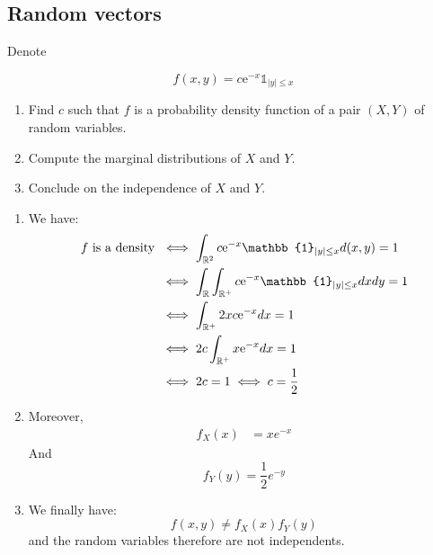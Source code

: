 \begin{center}
  \section*{Random vectors}
\end{center}


\begin{Exercise}
  Denote

  \[
    f(x, y)=c \mathrm{e}^{-x} \mathbb{1}_{|y| \leq x}
  \]

  \begin{enumerate}
    \item Find $c$ such that $f$ is a probability density function of a pair $(X, Y)$ of
          random variables.

    \item Compute the marginal distributions of $X$ and $Y$.

    \item Conclude on the independence of $X$ and $Y$.

  \end{enumerate}
\end{Exercise}


\begin{solution}
  \begin{enumerate}
    \item We have:
          \begin{align*}
            f \text{ is a density } & \iff \int_{\R^2} c \mathrm{e}^{-x} \mathbb{1}_{|y| \leq x} d(x,y)= 1           \\
                                    & \iff \int_{\R} \int_{\R^+} c \mathrm{e}^{-x} \mathbb{1}_{|y| \leq x} dx dy = 1 \\
                                    & \iff \int_{\R^+} 2 x c \mathrm{e}^{-x} dx= 1                                   \\
                                    & \iff 2c \int_{\R^+} x \mathrm{e}^{-x} dx= 1                                    \\
                                    & \iff 2c = 1 \iff c = \frac{1}{2}
          \end{align*}
    \item Moreover,
          \begin{align*}
            f_X(x) & = x e^{-x}
          \end{align*}
          And
          \[
            f_Y(y) =  \frac{1}{2} e^{-y}
          \]
    \item We finally have:
          \[
            f(x, y) \neq f_X(x) f_Y(y)
          \]
          and the random variables therefore are not independents.
  \end{enumerate}
\end{solution}

